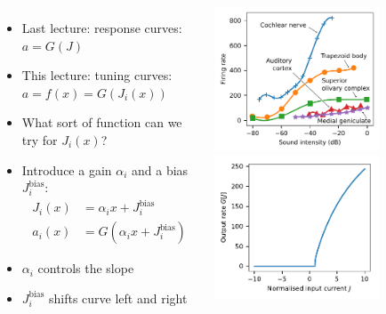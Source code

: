 \documentclass[handout,aspectratio=169]{beamer}
\begin{document}
\begin{frame}
	\begin{columns}
		\begin{itemize}
			\item Last lecture: response curves: $a=G(J)$
			\item This lecture: tuning curves: $a=f(x) = G(J_i(x))$
			\item What sort of function can we try for $J_i(x)$?
			\item<2-> Introduce a gain $\alpha_i$ and a bias $J^\mathrm{bias}_i$:
			\begin{align*}
				J_i(x) &= \alpha_i x + J^\mathrm{bias}_i \\
				a_i(x) &= G(\alpha_i x + J^\mathrm{bias}_i)			
			\end{align*}
			\item<2-> $\alpha_i$ controls the slope
			\item<2-> $J^\mathrm{bias}_i$ shifts curve left and right		
		\end{itemize}
		\includegraphics[width=0.7\textwidth]{media/audition_tuning_curves_annotated.pdf}\\
		\includegraphics[width=0.7\textwidth]{media/nonlinearity_lif.pdf}%
	\end{columns}
\end{frame}
\end{document}
